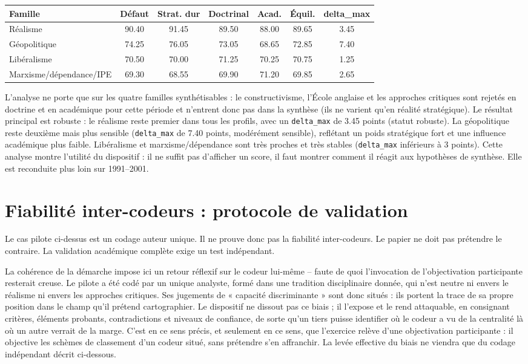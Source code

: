 \documentclass[11pt,a4paper]{article}
\begin{document}
\begin{center}
\begin{tabular}{p{3.4cm}cccccc}
\hline
Famille & Défaut & Strat. dur & Doctrinal & Acad. & Équil. & delta\_max \\
\hline
Réalisme & 90.40 & 91.45 & 89.50 & 88.00 & 89.65 & 3.45 \\
Géopolitique & 74.25 & 76.05 & 73.05 & 68.65 & 72.85 & 7.40 \\
Libéralisme & 70.50 & 70.00 & 71.25 & 70.25 & 70.75 & 1.25 \\
Marxisme/dépendance/IPE & 69.30 & 68.55 & 69.90 & 71.20 & 69.85 & 2.65 \\
\hline
\end{tabular}
\end{center}

L'analyse ne porte que sur les quatre familles synthétisables : le constructivisme, l'École anglaise et les approches critiques sont rejetés en doctrine et en académique pour cette période et n'entrent donc pas dans la synthèse (ils ne varient qu'en réalité stratégique). Le résultat principal est robuste : le réalisme reste premier dans tous les profils, avec un \texttt{delta\_max} de 3.45 points (statut robuste). La géopolitique reste deuxième mais plus sensible (\texttt{delta\_max} de 7.40 points, modérément sensible), reflétant un poids stratégique fort et une influence académique plus faible. Libéralisme et marxisme/dépendance sont très proches et très stables (\texttt{delta\_max} inférieurs à 3 points). Cette analyse montre l'utilité du dispositif : il ne suffit pas d'afficher un score, il faut montrer comment il réagit aux hypothèses de synthèse. Elle est reconduite plus loin sur 1991--2001.

\section{Fiabilité inter-codeurs : protocole de validation}

Le cas pilote ci-dessus est un codage auteur unique. Il ne prouve donc pas la fiabilité inter-codeurs. Le papier ne doit pas prétendre le contraire. La validation académique complète exige un test indépendant.

La cohérence de la démarche impose ici un retour réflexif sur le codeur lui-même -- faute de quoi l'invocation de l'objectivation participante resterait creuse. Le pilote a été codé par un unique analyste, formé dans une tradition disciplinaire donnée, qui n'est neutre ni envers le réalisme ni envers les approches critiques. Ses jugements de « capacité discriminante » sont donc situés : ils portent la trace de sa propre position dans le champ qu'il prétend cartographier. Le dispositif ne dissout pas ce biais ; il l'expose et le rend attaquable, en consignant critères, éléments probants, contradictions et niveaux de confiance, de sorte qu'un tiers puisse identifier où le codeur a vu de la centralité là où un autre verrait de la marge. C'est en ce sens précis, et seulement en ce sens, que l'exercice relève d'une objectivation participante : il objective les schèmes de classement d'un codeur situé, sans prétendre s'en affranchir. La levée effective du biais ne viendra que du codage indépendant décrit ci-dessous.
\end{document}
